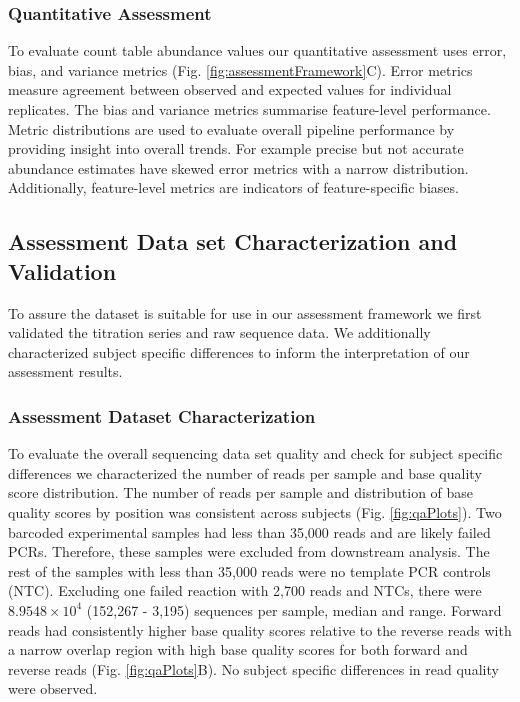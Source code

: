 \documentclass{bmcart}
\begin{document}
\subsubsection*{Quantitative Assessment}
To evaluate count table abundance values our quantitative assessment uses error, bias, and variance metrics (Fig. \ref{fig:assessmentFramework}C).
Error metrics measure agreement between observed and expected values for individual replicates.
The bias and variance metrics summarise feature-level performance.
Metric distributions are used to evaluate overall pipeline performance by providing insight into overall trends.
For example precise but not accurate abundance estimates have skewed error metrics with a narrow distribution.
Additionally, feature-level metrics are indicators of feature-specific biases.

\subsection*{Assessment Data set Characterization and Validation}
To assure the dataset is suitable for use in our assessment framework we first validated the titration series and raw sequence data.
We additionally characterized subject specific differences to inform the interpretation of our assessment results.

\subsubsection*{Assessment Dataset Characterization}
To evaluate the overall sequencing data set quality and check for subject
specific differences we characterized the number of reads per sample and
base quality score distribution. The number of reads per sample and
distribution of base quality scores by position was consistent across subjects (Fig. \ref{fig:qaPlots}).
Two barcoded experimental samples had less than
35,000 reads and are likely failed PCRs.
Therefore, these samples were excluded from downstream analysis.
The rest of the samples with less than 35,000 reads were no template PCR
controls (NTC). Excluding one failed reaction with 2,700 reads and NTCs, there
were \(8.9548\times 10^{4}\) (152,267 - 3,195) sequences per sample, median and
range. Forward reads had consistently higher base quality scores relative to
the reverse reads with a narrow overlap region with high base quality scores
for both forward and reverse reads (Fig. \ref{fig:qaPlots}B).
No subject specific differences in read quality were observed.
\end{document}
